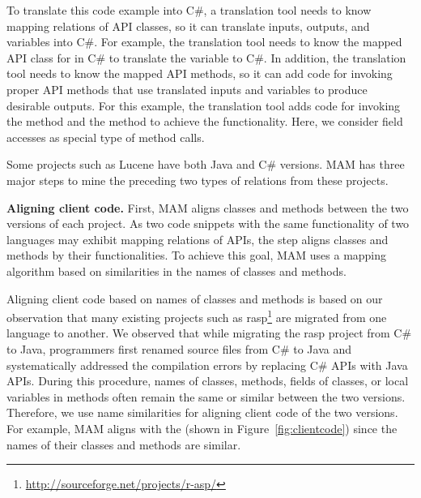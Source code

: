 To translate this code example into C\#, a translation tool needs to
know mapping relations of API classes, so it can translate inputs,
outputs, and variables into C\#. For example, the translation tool
needs to know the mapped API class for  in C\#
to translate the variable  to C\#. In addition, the
translation tool needs to know the mapped API methods, so it can
add code for invoking proper API methods that use translated inputs and variables to
produce desirable outputs. For this example, the translation tool
adds code for invoking the  method and the
 method to achieve the functionality.
Here, we consider field accesses as special type of method calls.

Some projects such as Lucene have both Java and C\# versions. MAM
has three major steps to mine the preceding two types of relations from these projects.

\textbf{Aligning client code.} First, MAM aligns classes and methods
between the two versions of each project. As two code snippets with
the same functionality of two languages may exhibit mapping
relations of APIs, the step aligns classes and methods by their
functionalities. To achieve this goal, MAM uses a mapping algorithm
based on similarities in the names of classes and methods.

Aligning client code based on names of classes and methods is based
on our observation that many existing projects such as
rasp\footnote{\url{http://sourceforge.net/projects/r-asp/}} are
migrated from one language to another. We observed that while
migrating the rasp project from C\# to Java, programmers first
renamed source files from C\# to Java and systematically addressed
the compilation errors by replacing C\# APIs with Java APIs. During
this procedure, names of classes, methods, fields of classes, or
local variables in methods often remain the same or similar between
the two versions. Therefore, we use name similarities for aligning
client code of the two versions. For example, MAM aligns
 with the  (shown in
Figure~\ref{fig:clientcode}) since the names of their classes and
methods are similar.

